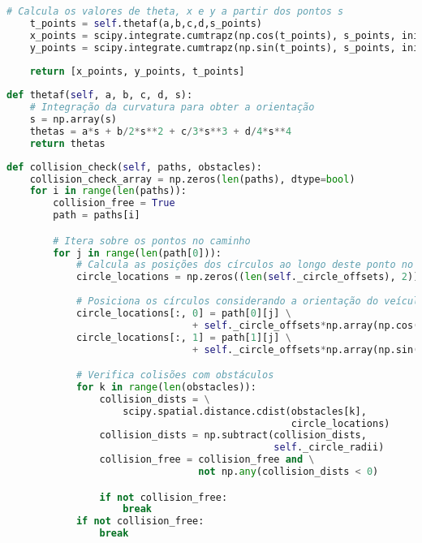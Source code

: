 \documentclass[
	12pt,				%
	oneside, %
	a4paper,			%
	english,			%
	french,				%
	spanish,			%
	brazil				%
	]{abntex2}
\begin{document}
\begin{apendicesenv}
\begin{lstlisting}[language=Python, caption=Implementação do método para amostragem de pontos ao longo da espiral otimizada., label=lst:sample_spiral_implementation]
    # Calcula os valores de theta, x e y a partir dos pontos s
    t_points = self.thetaf(a,b,c,d,s_points)
    x_points = scipy.integrate.cumtrapz(np.cos(t_points), s_points, initial=0)
    y_points = scipy.integrate.cumtrapz(np.sin(t_points), s_points, initial=0)
    
    return [x_points, y_points, t_points]
\end{lstlisting}

\begin{lstlisting}[language=Python, caption=Implementação do cálculo de orientação a partir da integração da equação de curvatura., label=lst:thetaf_implementation]
def thetaf(self, a, b, c, d, s):
    # Integração da curvatura para obter a orientação
    s = np.array(s)
    thetas = a*s + b/2*s**2 + c/3*s**3 + d/4*s**4
    return thetas
\end{lstlisting}

\begin{lstlisting}[language=Python, caption=Implementação do método de verificação de colisões., label=lst:collision_check_implementation]
def collision_check(self, paths, obstacles):
    collision_check_array = np.zeros(len(paths), dtype=bool)
    for i in range(len(paths)):
        collision_free = True
        path = paths[i]

        # Itera sobre os pontos no caminho
        for j in range(len(path[0])):
            # Calcula as posições dos círculos ao longo deste ponto no caminho
            circle_locations = np.zeros((len(self._circle_offsets), 2))
            
            # Posiciona os círculos considerando a orientação do veículo
            circle_locations[:, 0] = path[0][j] \
                                + self._circle_offsets*np.array(np.cos(path[2][j]))
            circle_locations[:, 1] = path[1][j] \
                                + self._circle_offsets*np.array(np.sin(path[2][j]))

            # Verifica colisões com obstáculos
            for k in range(len(obstacles)):
                collision_dists = \
                    scipy.spatial.distance.cdist(obstacles[k],
                                                 circle_locations)
                collision_dists = np.subtract(collision_dists,
                                              self._circle_radii)
                collision_free = collision_free and \
                                 not np.any(collision_dists < 0)

                if not collision_free:
                    break
            if not collision_free:
                break


\end{lstlisting}
\end{apendicesenv}
\end{document}
